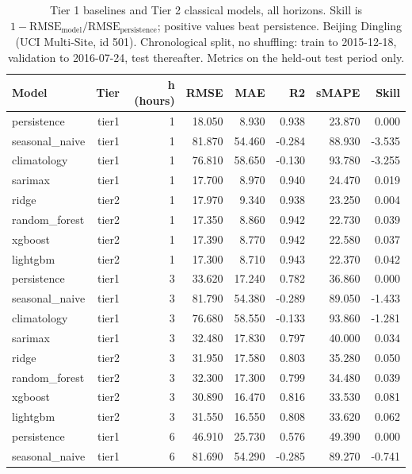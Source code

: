 \begin{table}[htbp]
\caption{Tier 1 baselines and Tier 2 classical models, all horizons. Skill is $1 - \mathrm{RMSE}_{\mathrm{model}}/\mathrm{RMSE}_{\mathrm{persistence}}$; positive values beat persistence. Beijing Dingling (UCI Multi-Site, id 501). Chronological split, no shuffling: train to 2015-12-18, validation to 2016-07-24, test thereafter. Metrics on the held-out test period only.}
\label{tab:tier1_tier2_all_horizons}
\begin{tabular}{lrrrrrrr}
\toprule
Model & Tier & h (hours) & RMSE & MAE & R2 & sMAPE & Skill \\
\midrule
persistence & tier1 & 1 & 18.050 & 8.930 & 0.938 & 23.870 & 0.000 \\
seasonal\_naive & tier1 & 1 & 81.870 & 54.460 & -0.284 & 88.930 & -3.535 \\
climatology & tier1 & 1 & 76.810 & 58.650 & -0.130 & 93.780 & -3.255 \\
sarimax & tier1 & 1 & 17.700 & 8.970 & 0.940 & 24.470 & 0.019 \\
ridge & tier2 & 1 & 17.970 & 9.340 & 0.938 & 23.250 & 0.004 \\
random\_forest & tier2 & 1 & 17.350 & 8.860 & 0.942 & 22.730 & 0.039 \\
xgboost & tier2 & 1 & 17.390 & 8.770 & 0.942 & 22.580 & 0.037 \\
lightgbm & tier2 & 1 & 17.300 & 8.710 & 0.943 & 22.370 & 0.042 \\
persistence & tier1 & 3 & 33.620 & 17.240 & 0.782 & 36.860 & 0.000 \\
seasonal\_naive & tier1 & 3 & 81.790 & 54.380 & -0.289 & 89.050 & -1.433 \\
climatology & tier1 & 3 & 76.680 & 58.550 & -0.133 & 93.860 & -1.281 \\
sarimax & tier1 & 3 & 32.480 & 17.830 & 0.797 & 40.000 & 0.034 \\
ridge & tier2 & 3 & 31.950 & 17.580 & 0.803 & 35.280 & 0.050 \\
random\_forest & tier2 & 3 & 32.300 & 17.300 & 0.799 & 34.480 & 0.039 \\
xgboost & tier2 & 3 & 30.890 & 16.470 & 0.816 & 33.530 & 0.081 \\
lightgbm & tier2 & 3 & 31.550 & 16.550 & 0.808 & 33.620 & 0.062 \\
persistence & tier1 & 6 & 46.910 & 25.730 & 0.576 & 49.390 & 0.000 \\
seasonal\_naive & tier1 & 6 & 81.690 & 54.290 & -0.285 & 89.270 & -0.741 \\

\end{tabular}
\end{table}

